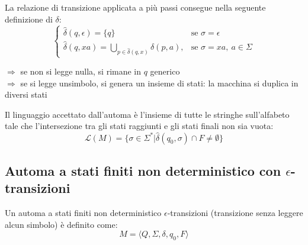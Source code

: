 \documentclass[12pt, a4paper, oneside]{book}
\begin{document}


  La relazione di transizione applicata a più passi consegue nella seguente definizione di $\delta$:
  \begin{equation*}
    \begin{cases}
      \hat{\delta}(q, \epsilon) = \{q\} & \text{se } \sigma = \epsilon \\[0.5em]
      \hat{\delta}(q, xa) = \bigcup_{p \in \hat{\delta}(q, x)} \delta(p, a), & \text{se } \sigma = xa, \ a \in \Sigma
    \end{cases}
  \end{equation*}

  $\Rightarrow$ se non si legge nulla, si rimane in $q$ generico \\[0.2ex]
  $\Rightarrow$ se si legge unsimbolo, si genera un insieme di stati: la macchina si duplica in diversi stati

  Il linguaggio accettato dall'automa è l'insieme di tutte le stringhe sull'alfabeto tale che l'intersezione tra gli stati raggiunti e gli stati finali non sia vuota:
  \begin{equation*}
    \mathcal{L}(M) = \{\sigma \in \Sigma^* | \hat{\delta}(q_0, \sigma) \cap F \neq \emptyset\}
  \end{equation*}


  \subsection{Automa a stati finiti non deterministico con \texorpdfstring{$\epsilon$}{epsilon}-transizioni}
  Un \textcolor{azzurrino}{automa a stati finiti non deterministico \texorpdfstring{$\epsilon$}{epsilon}-transizioni} (transizione senza leggere alcun simbolo) è definito come:
  \begin{equation*}
    M = \langle Q, \Sigma, \delta, q_0, F \rangle
  \end{equation*}
\end{document}
